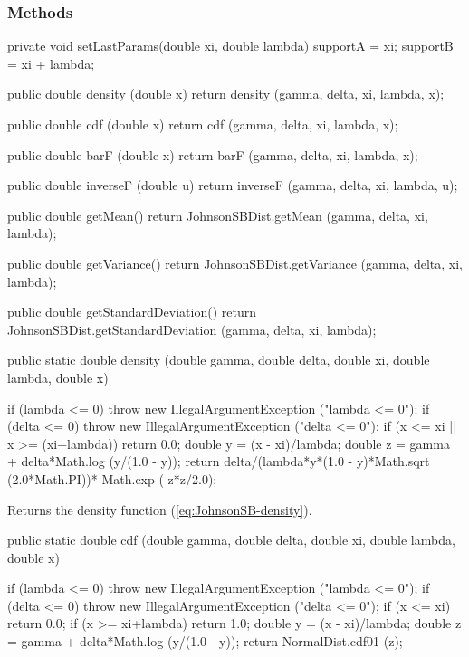 \subsubsection* {Methods}
\begin{hide}
\begin{code}

   private void setLastParams(double xi, double lambda) {
      supportA = xi;
      supportB = xi + lambda;
   }

   public double density (double x) {
      return density (gamma, delta, xi, lambda, x);
   }

   public double cdf (double x) {
      return cdf (gamma, delta, xi, lambda, x);
   }

   public double barF (double x) {
      return barF (gamma, delta, xi, lambda, x);
   }

   public double inverseF (double u) {
      return inverseF (gamma, delta, xi, lambda, u);
   }

   public double getMean() {
      return JohnsonSBDist.getMean (gamma, delta, xi, lambda);
   }

   public double getVariance() {
      return JohnsonSBDist.getVariance (gamma, delta, xi, lambda);
   }

   public double getStandardDeviation() {
      return JohnsonSBDist.getStandardDeviation (gamma, delta, xi, lambda);
   }
\end{code}
\end{hide}\begin{code}

   public static double density (double gamma, double delta,
                                 double xi, double lambda, double x)\begin{hide} {
      if (lambda <= 0)
         throw new IllegalArgumentException ("lambda <= 0");
      if (delta <= 0)
         throw new IllegalArgumentException ("delta <= 0");
      if (x <= xi || x >= (xi+lambda))
         return 0.0;
      double y = (x - xi)/lambda;
      double z = gamma + delta*Math.log (y/(1.0 - y));
      return delta/(lambda*y*(1.0 - y)*Math.sqrt (2.0*Math.PI))*
           Math.exp (-z*z/2.0);
   }\end{hide}
\end{code}
\begin{tabb} Returns the density function (\ref{eq:JohnsonSB-density}).
\end{tabb}
\begin{code}

   public static double cdf (double gamma, double delta,
                             double xi, double lambda, double x)\begin{hide} {
      if (lambda <= 0)
         throw new IllegalArgumentException ("lambda <= 0");
      if (delta <= 0)
         throw new IllegalArgumentException ("delta <= 0");
      if (x <= xi)
         return 0.0;
      if (x >= xi+lambda)
         return 1.0;
      double y = (x - xi)/lambda;
      double z = gamma + delta*Math.log (y/(1.0 - y));
      return NormalDist.cdf01 (z);
   }\end{hide}
\end{code}
